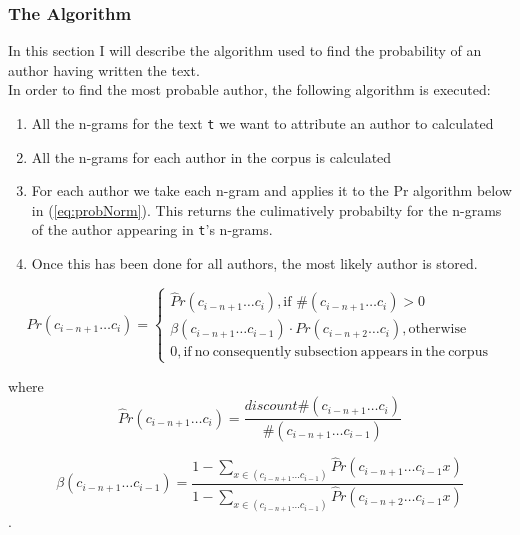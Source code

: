 \subsubsection{The Algorithm}
In this section I will describe the algorithm used to find the probability of an author having written the text.\\

In order to find the most probable author, the following algorithm is executed:

\begin{enumerate}
\item All the n-grams for the text \texttt{t} we want to attribute an author to calculated
\item All the n-grams for each author in the corpus is calculated
\item For each author we take each n-gram and applies it to the Pr algorithm below in (\ref{eq:probNorm}). This returns the culimatively probabilty for the n-grams of the author appearing in \texttt{t}'s n-grams. 
\item Once this has been done for all authors, the most likely author is stored.
\end{enumerate}

\begin{equation}
\label{eq:probNorm}
Pr(c_{i - n + 1} \ldots c_{i}) = \left\{
\begin{array}{rl}
\hat{P}r(c_{i - n + 1} \ldots c_{i}), \text{if } \#(c_{i - n + 1} \ldots c_{i}) > 0\\
\beta(c_{i - n + 1} \ldots c_{i-1}) \cdot Pr(c_{i - n + 2} \ldots c_{i}), \mathrm{otherwise}\\
0, \mathrm{if\ no\ consequently\ subsection\ appears\ in\ the\ corpus}
\end{array} \right.
\end{equation}

where 
\begin{equation}
\label{eq:probHat}
\hat{P}r(c_{i - n + 1} \ldots c_{i}) = \frac{discount \#(c_{i - n + 1} \ldots c_{i})}{\#(c_{i - n + 1} \ldots c_{i-1})}
\end{equation}

\begin{equation}
\label{eq:beta}
\beta(c_{i - n + 1} \ldots c_{i-1}) = 
\frac
{1 - \sum_{x \in (c_{i - n + 1} \ldots c_{i-1})}\hat{P}r(c_{i - n + 1} \ldots c_{i-1} x)}
{1 - \sum_{x \in (c_{i - n + 1} \ldots c_{i-1})}\hat{P}r(c_{i - n + 2} \ldots c_{i-1} x)}
\end{equation}.

